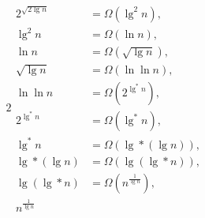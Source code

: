 \begin{alignat*}{2}
\begin{aligned}
		2^{\sqrt{2 \lg n}} &= \Omega \left(\lg ^2 n \right), \\
		\lg ^2 n &= \Omega \left(\ln n \right), \\
		\ln n &= \Omega \left(\sqrt{\lg n} \right), \\
		\sqrt{\lg n} &= \Omega \left(\ln \ln n \right), \\
		\ln \ln n &= \Omega \left(2^{\lg ^* n} \right), \\
		2^{\lg ^* n} &= \Omega \left(\lg ^* n \right), \\
		\lg ^* n &= \Omega \left(\lg * (\lg n) \right), \\
		\lg * (\lg n) &= \Omega \left(\lg (\lg * n) \right), \\
		\lg (\lg * n) &= \Omega \left(n^{\frac{1}{\lg n}} \right), \\
		n^{\frac{1}{\lg n}}
	\end{aligned}
\end{alignat*}

